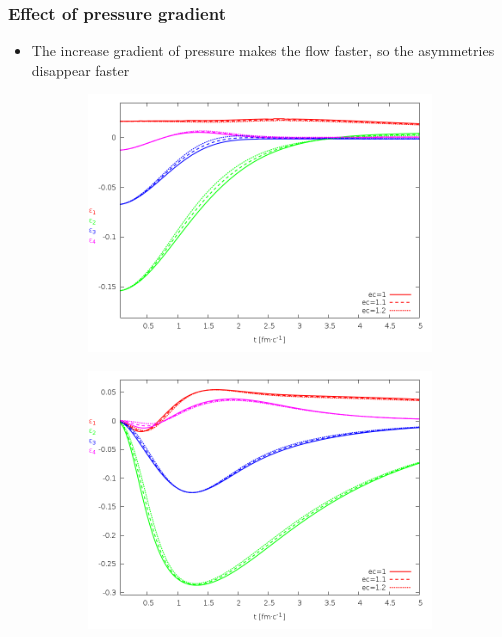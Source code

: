 \documentclass{beamer}
\begin{document}
\begin{frame}
\frametitle{Effect of pressure gradient}
\begin{center}
\begin{itemize}
\item The increase gradient of pressure makes the flow faster, so the asymmetries disappear faster
\end{itemize}
\begin{figure}[H]
	\centering
    \begin{subfigure}[b]{0.49\textwidth}
    		\includegraphics[width=\textwidth]{pic/res/nonrel/eps_ec_r}
	\end{subfigure}
	\begin{subfigure}[b]{0.49\textwidth}
        	\includegraphics[width=\textwidth]{pic/res/nonrel/eps_ec_v}
	\end{subfigure}
\end{figure}
\end{center}
\end{frame}
\end{document}
